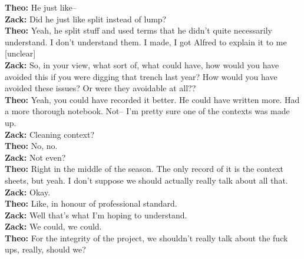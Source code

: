 \documentclass[
]{article}
\begin{document}
\textbf{Theo:} He just like--\\
\textbf{Zack:} Did he just like split instead of lump?\\
\textbf{Theo:} Yeah, he split stuff and used terms that he didn't quite
necessarily understand. I don't understand them. I made, I got Alfred to
explain it to me {[}unclear{]}\\
\textbf{Zack:} So, in your view, what sort of, what could have, how
would you have avoided this if you were digging that trench last year?
How would you have avoided these issues? Or were they avoidable at
all??\\
\textbf{Theo:} Yeah, you could have recorded it better. He could have
written more. Had a more thorough notebook. Not-- I'm pretty sure one of
the contexts was made up.\\
\textbf{Zack:} Cleaning context?\\
\textbf{Theo:} No, no.\\
\textbf{Zack:} Not even?\\
\textbf{Theo:} Right in the middle of the season. The only record of it
is the context sheets, but yeah. I don't suppose we should actually
really talk about all that.\\
\textbf{Zack:} Okay.\\
\textbf{Theo:} Like, in honour of professional standard.\\
\textbf{Zack:} Well that's what I'm hoping to understand.\\
\textbf{Zack:} We could, we could.\\
\textbf{Theo:} For the integrity of the project, we shouldn't really
talk about the fuck ups, really, should we?
\end{document}
